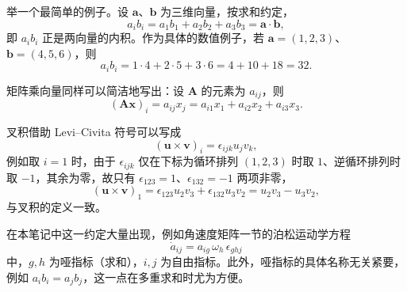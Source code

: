 举一个最简单的例子。设 $\bm{a}$、$\bm{b}$ 为三维向量，按求和约定，
\begin{equation}
    a_ib_i=a_1b_1+a_2b_2+a_3b_3=\bm{a}\cdot\bm{b},
    \label{eq:符号说明:求和内积}
\end{equation}
即 $a_ib_i$ 正是两向量的内积。作为具体的数值例子，若 $\bm{a}=(1,2,3)$、$\bm{b}=(4,5,6)$，则
\begin{equation}
    a_ib_i=1\cdot4+2\cdot5+3\cdot6=4+10+18=32.
\end{equation}

矩阵乘向量同样可以简洁地写出：设 $\bm{A}$ 的元素为 $a_{ij}$，则
\begin{equation}
    (\bm{A}\bm{x})_i=a_{ij}x_j=a_{i1}x_1+a_{i2}x_2+a_{i3}x_3.
\end{equation}

叉积借助 Levi--Civita 符号可以写成
\begin{equation}
    (\bm{u}\times\bm{v})_i=\epsilon_{ijk}u_jv_k,
\end{equation}
例如取 $i=1$ 时，由于 $\epsilon_{ijk}$ 仅在下标为循环排列 $(1,2,3)$ 时取 $1$、逆循环排列时取 $-1$，其余为零，故只有 $\epsilon_{123}=1$、$\epsilon_{132}=-1$ 两项非零，
\begin{equation}
    (\bm{u}\times\bm{v})_1=\epsilon_{123}u_2v_3+\epsilon_{132}u_3v_2=u_2v_3-u_3v_2,
\end{equation}
与叉积的定义一致。

在本笔记中这一约定大量出现，例如角速度矩阵一节的泊松运动学方程
\begin{equation}
    \dot{a}_{ij}=a_{ig}\,\omega_h\,\epsilon_{ghj}
\end{equation}
中，$g,h$ 为哑指标（求和），$i,j$ 为自由指标。此外，哑指标的具体名称无关紧要，例如 $a_ib_i=a_jb_j$，这一点在多重求和时尤为方便。
